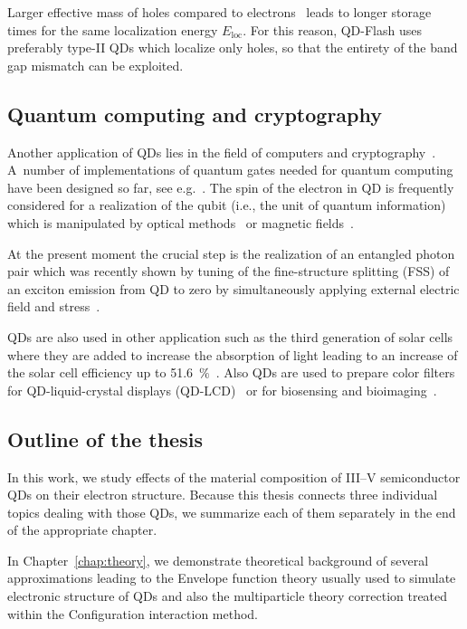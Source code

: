 \documentclass[
a4paper, %
11pt, %
onecolumn, %
openany, %
oldfontcommands,
]{memoir}
\begin{document}
Larger effective mass of holes compared to electrons~\cite{sze} leads to longer storage times for the same localization energy $E_\mathrm{loc}$. For this reason, QD-Flash uses preferably type-II QDs which localize only holes, so that the entirety of the band gap mismatch can be exploited.

\subsection*{Quantum computing and cryptography}
Another application of QDs lies in the field of computers and cryptography~\cite{Feynman,Deutsch,Loss}. A~number of implementations of quantum gates needed for quantum computing have been designed so far, see e.g.~\cite{Bennett}. The spin of the electron in QD is frequently considered for a realization of the qubit (i.e., the unit of quantum information)~\cite{Loss} which is manipulated by optical methods~\cite{Hafenbrak} or magnetic fields~\cite{Burkard}. 

At the present moment the crucial step is the realization of an entangled photon pair which was recently shown by tuning of the fine-structure splitting (FSS) of an exciton emission from QD to zero by simultaneously applying external electric field and stress~\cite{Trotta}.

\vspace{0.2cm}
QDs are also used in other application such as the third generation of solar cells where they are added to increase the absorption of light leading to an increase of the solar cell efficiency up to 51.6~$\%$~\cite{Jiang_NonoEn2015_QDsolarcell}. Also QDs are used to prepare color filters for QD-liquid-crystal displays (QD-LCD)~\cite{Chen_IEEE_2017_QLED} or for biosensing and bioimaging~\cite{Li_JMaterChemB_2014_biosensing}.

\subsection*{Outline of the thesis}
\vspace{0.2cm}
In this work, we study effects of the material composition of III--V semiconductor QDs on their electron structure. Because this thesis connects three individual topics dealing with those QDs, we summarize each of them separately in the end of the appropriate chapter.

In Chapter~\ref{chap:theory}, we demonstrate theoretical background of several approximations leading to the Envelope function theory usually used to simulate electronic structure of QDs and also the multiparticle theory correction treated within the Configuration interaction method.
\end{document}
